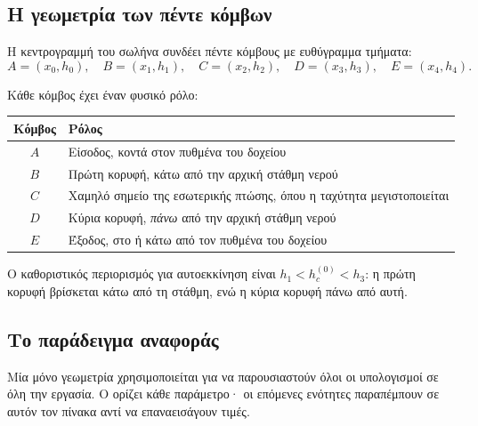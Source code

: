\documentclass[11pt]{article}
\begin{document}
\subsection{Η γεωμετρία των πέντε κόμβων}

Η κεντρογραμμή του σωλήνα συνδέει πέντε κόμβους με ευθύγραμμα τμήματα:
\[
  A = (x_0, h_0), \quad B = (x_1, h_1), \quad C = (x_2, h_2), \quad D = (x_3, h_3), \quad E = (x_4, h_4).
\]

Κάθε κόμβος έχει έναν φυσικό ρόλο:
\begin{center}
\renewcommand{\arraystretch}{1.2}
\begin{tabular}{cl}
\toprule
Κόμβος & Ρόλος \\
\midrule
$A$ & Είσοδος, κοντά στον πυθμένα του δοχείου \\
$B$ & Πρώτη κορυφή, κάτω από την αρχική στάθμη νερού \\
$C$ & Χαμηλό σημείο της εσωτερικής πτώσης, όπου η ταχύτητα μεγιστοποιείται \\
$D$ & Κύρια κορυφή, \emph{πάνω} από την αρχική στάθμη νερού \\
$E$ & Έξοδος, στο ή κάτω από τον πυθμένα του δοχείου \\
\bottomrule
\end{tabular}
\end{center}

Ο καθοριστικός περιορισμός για αυτοεκκίνηση είναι $h_1 < h_c^{(0)} < h_3$: η πρώτη κορυφή βρίσκεται κάτω από τη στάθμη, ενώ η κύρια κορυφή πάνω από αυτή.

\subsection{Το παράδειγμα αναφοράς}
\label{sec:worked-example}

Μία μόνο γεωμετρία χρησιμοποιείται για να παρουσιαστούν όλοι οι υπολογισμοί σε όλη την εργασία. Ο  ορίζει κάθε παράμετρο· οι επόμενες ενότητες παραπέμπουν σε αυτόν τον πίνακα αντί να επαναεισάγουν τιμές.
\end{document}
